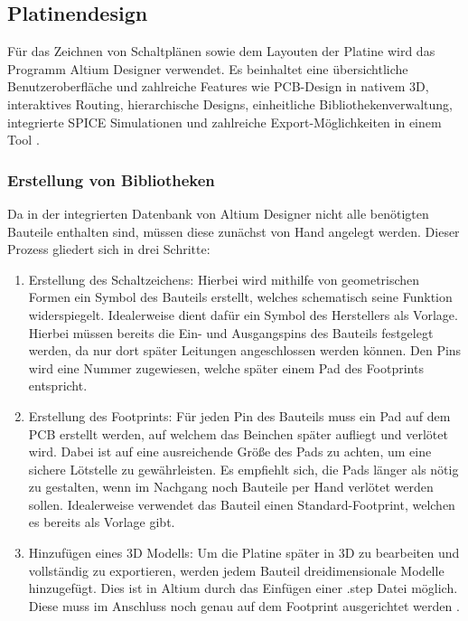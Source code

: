 

\subsection{Platinendesign}

Für das Zeichnen von Schaltplänen sowie dem Layouten der Platine wird das Programm Altium Designer verwendet. Es beinhaltet eine übersichtliche Benutzeroberfläche und zahlreiche Features wie PCB-Design in nativem 3D, interaktives Routing, hierarchische Designs, einheitliche Bibliothekenverwaltung, integrierte SPICE Simulationen und zahlreiche Export-Möglichkeiten in einem Tool \cite{Altium_Homepage}. 

\subsubsection{Erstellung von Bibliotheken}
Da in der integrierten Datenbank von Altium Designer nicht alle benötigten Bauteile enthalten sind, müssen diese zunächst von Hand angelegt werden. Dieser Prozess gliedert sich in drei Schritte:

\begin{enumerate}
\item Erstellung des Schaltzeichens: Hierbei wird mithilfe von geometrischen Formen ein Symbol des Bauteils erstellt, welches schematisch seine Funktion widerspiegelt. Idealerweise dient dafür ein Symbol des Herstellers als Vorlage. Hierbei müssen bereits die Ein- und Ausgangspins des Bauteils festgelegt werden, da nur dort später Leitungen angeschlossen werden können. Den Pins wird eine Nummer zugewiesen, welche später einem Pad des Footprints entspricht.

\item Erstellung des Footprints: Für jeden Pin des Bauteils muss ein Pad auf dem PCB erstellt werden, auf welchem das Beinchen später aufliegt und verlötet wird. Dabei ist auf eine ausreichende Größe des Pads zu achten, um eine sichere Lötstelle zu gewährleisten. Es empfiehlt sich, die Pads länger als nötig zu gestalten, wenn im Nachgang noch Bauteile per Hand verlötet werden sollen. Idealerweise verwendet das Bauteil einen Standard-Footprint, welchen es bereits als Vorlage gibt. 

\item Hinzufügen eines 3D Modells: Um die Platine später in 3D zu bearbeiten und vollständig zu exportieren, werden jedem Bauteil dreidimensionale Modelle hinzugefügt. Dies ist in Altium durch das Einfügen einer .step Datei möglich. Diese muss im Anschluss noch genau auf dem Footprint ausgerichtet werden \cite{Altium_PCB_Footprint}.
\end{enumerate}

